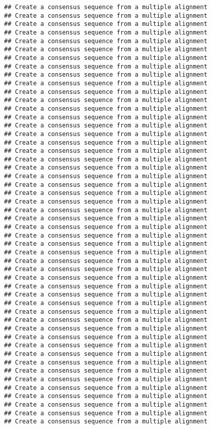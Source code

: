 \documentclass[
]{book}
\begin{document}
\begin{verbatim}
## Create a consensus sequence from a multiple alignment
## Create a consensus sequence from a multiple alignment
## Create a consensus sequence from a multiple alignment
## Create a consensus sequence from a multiple alignment
## Create a consensus sequence from a multiple alignment
## Create a consensus sequence from a multiple alignment
## Create a consensus sequence from a multiple alignment
## Create a consensus sequence from a multiple alignment
## Create a consensus sequence from a multiple alignment
## Create a consensus sequence from a multiple alignment
## Create a consensus sequence from a multiple alignment
## Create a consensus sequence from a multiple alignment
## Create a consensus sequence from a multiple alignment
## Create a consensus sequence from a multiple alignment
## Create a consensus sequence from a multiple alignment
## Create a consensus sequence from a multiple alignment
## Create a consensus sequence from a multiple alignment
## Create a consensus sequence from a multiple alignment
## Create a consensus sequence from a multiple alignment
## Create a consensus sequence from a multiple alignment
## Create a consensus sequence from a multiple alignment
## Create a consensus sequence from a multiple alignment
## Create a consensus sequence from a multiple alignment
## Create a consensus sequence from a multiple alignment
## Create a consensus sequence from a multiple alignment
## Create a consensus sequence from a multiple alignment
## Create a consensus sequence from a multiple alignment
## Create a consensus sequence from a multiple alignment
## Create a consensus sequence from a multiple alignment
## Create a consensus sequence from a multiple alignment
## Create a consensus sequence from a multiple alignment
## Create a consensus sequence from a multiple alignment
## Create a consensus sequence from a multiple alignment
## Create a consensus sequence from a multiple alignment
## Create a consensus sequence from a multiple alignment
## Create a consensus sequence from a multiple alignment
## Create a consensus sequence from a multiple alignment
## Create a consensus sequence from a multiple alignment
## Create a consensus sequence from a multiple alignment
## Create a consensus sequence from a multiple alignment
## Create a consensus sequence from a multiple alignment
## Create a consensus sequence from a multiple alignment
## Create a consensus sequence from a multiple alignment
## Create a consensus sequence from a multiple alignment
## Create a consensus sequence from a multiple alignment
## Create a consensus sequence from a multiple alignment
## Create a consensus sequence from a multiple alignment
## Create a consensus sequence from a multiple alignment
## Create a consensus sequence from a multiple alignment
## Create a consensus sequence from a multiple alignment
\end{verbatim}
\end{document}
